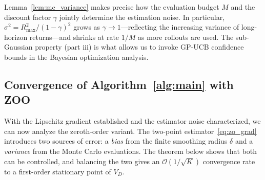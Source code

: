 \documentclass[12pt]{article}
\renewcommand{\[}{\left[}
\renewcommand{\]}{\right]}
\renewcommand{\(}{\left(}
\renewcommand{\)}{\right)}
\newcounter{l1}
\newcounter{l2}
\newcounter{l3}
\newcommand{\Rmax}{R_{\max}}
\begin{document}
Lemma~\ref{lem:mc_variance} makes precise how the evaluation budget $M$ and the
discount factor $\gamma$ jointly determine the estimation noise. In particular,
$\sigma^2 = \Rmax^2/(1-\gamma)^2$ grows as $\gamma \to 1$---reflecting the increasing
variance of long-horizon returns---and shrinks at rate $1/M$ as more rollouts are used.
The sub-Gaussian property (part iii) is what allows us to invoke GP-UCB confidence
bounds in the Bayesian optimization analysis.

\subsection{Convergence of Algorithm~\ref{alg:main} with ZOO}
\label{sec:zoo_convergence}

With the Lipschitz gradient established and the estimator noise characterized, we can
now analyze the zeroth-order variant. The two-point estimator~\eqref{eq:zo_grad}
introduces two sources of error: a \emph{bias} from the finite smoothing radius
$\delta$ and a \emph{variance} from the Monte Carlo evaluations. The theorem below
shows that both can be controlled, and balancing the two gives an
$\mathcal{O}(1/\sqrt{K})$ convergence rate to a first-order stationary point of $V_D$.
\end{document}
